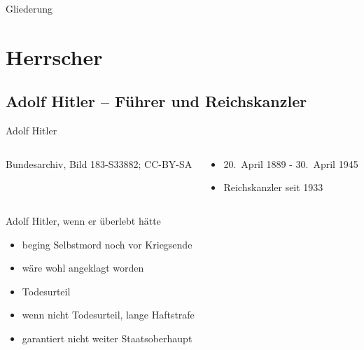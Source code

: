 

\begin{frame}
	\maketitle
\end{frame}

\begin{frame}{Gliederung}
	\tableofcontents
\end{frame}

\section{Herrscher}

\subsection{Adolf Hitler -- Führer und Reichskanzler}

\begin{frame}{Adolf Hitler}
	\begin{columns}
		\begin{column}{0.6\textwidth}
				{Bundesarchiv, Bild 183-S33882; CC-BY-SA}
		\end{column}
		\begin{column}{0.39\textwidth}
			\begin{itemize}
				\item 20.\ April 1889 - 30.\ April 1945
				\item Reichskanzler seit 1933
			\end{itemize}
		\end{column}
	\end{columns}
\end{frame}


\begin{frame}{Adolf Hitler, wenn er überlebt hätte}
	\begin{itemize}
		\item beging Selbstmord noch vor Kriegsende
		\pause
		\item wäre wohl angeklagt worden
		\pause
		\item Todesurteil
		\pause
		\item wenn nicht Todesurteil, lange Haftstrafe
		\item garantiert nicht weiter Staatsoberhaupt
	\end{itemize}
\end{frame}

